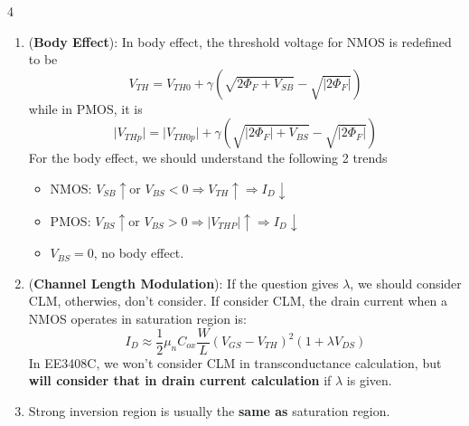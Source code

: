\documentclass[10pt, landscape]{article}
\begin{document}
\begin{multicols}{4}
\begin{enumerate}
$$    $$
    For NMOS operating in \textbf{linear region}, its $g_m$ is
    $$ g_m=\mu_n C_{ox} \frac{W}{L} V_{DS}$$
    \item (\textbf{Body Effect}): In body effect, the threshold voltage for NMOS is redefined to be
    $$
    V_{TH} = V_{TH0} + \gamma \left( \sqrt{2\Phi_F + V_{SB}} - \sqrt{|2\Phi_F|} \right)
    $$
    while in PMOS, it is
    $$\vert{}V_{THp}\vert{} = \vert{}V_{TH0p}\vert{} + \gamma (\sqrt{\vert{}2\Phi_F\vert{} + V_{BS}} - \sqrt{\vert{}2\Phi_F\vert{}})$$
    For the body effect, we should understand the following 2 trends
    \begin{itemize}
        \item NMOS: $V_{SB}\uparrow \text{or } V_{BS}<0\Rightarrow V_{TH}\uparrow\Rightarrow I_D\downarrow$
        \item PMOS: $V_{BS}\uparrow \text{or } V_{BS}>0\Rightarrow |V_{THP}|\uparrow\Rightarrow I_D\downarrow$
        \item $V_{BS}=0$, no body effect.
    \end{itemize}
    \item (\textbf{Channel Length Modulation}): If the question gives $\lambda$, we should consider CLM, otherwies, don't consider. If consider CLM, the drain current when a NMOS operates in saturation region is:
    $$I_D \approx \frac{1}{2}\mu_n C_{ox}\frac{W}{L}(V_{GS}-V_{TH})^2(1+\lambda V_{DS})$$
    In EE3408C, we won't consider CLM in transconductance calculation, but \textbf{will consider that in drain current calculation} if $\lambda$ is given.
    \item Strong inversion region is usually the \textbf{same as} saturation region.
\end{enumerate}


\end{multicols}
\end{document}
